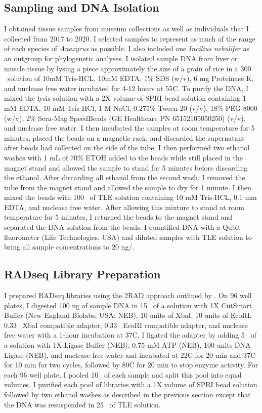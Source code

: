 \subsection{Sampling and DNA Isolation}
I obtained tissue samples from museum collections as well as individuals   
that I collected from 2017 to 2020. I selected samples to represent as much
of the range of each species of \textit{Anaxyrus} as possible.
I also included one \textit{Incilius nebulifer} as an outgroup for phylogenetic analyses.
I isolated sample DNA from liver or muscle tissue by lysing a piece approximately 
the size of a grain of rice in a 300 \uL\ solution of 10mM Tris-HCL, 10mM EDTA, 
1\% SDS (w/v), 6 mg Proteinase K, and nuclease free water incubated for 4-12 
hours at 55\degree C.  
To purify the DNA, I mixed the lysis solution with a 2X volume of SPRI bead 
solution containing 1 mM EDTA, 10 mM Tris-HCl, 1 M NaCl, 0.275\% Tween-20 (v/v), 18\% PEG 8000 (w/v), 
2\% Sera-Mag SpeedBeads (GE Healthcare PN 65152105050250) (v/v), and nuclease free water.
I then incubated the samples at room temperature for 5 minutes, placed the 
beads on a magnetic rack, and discarded the supernatant after beads had collected
on the side of the tube.  
I then performed two ethanol washes with 1 mL of 70\% ETOH added to the beads
while still placed in the magnet stand and allowed the sample to stand for 5 minutes
before discarding the ethanol. 
After discarding all ethanol from the second wash, I removed the tube from the magnet 
stand and allowed the sample to dry for 1 minute.
I then mixed the beads with 100 \uL\ of TLE solution containing 10 mM Tris-HCL, 
0.1 mm EDTA, and nuclease free water.
After allowing this mixture to stand at room temperature for 5 minutes, I returned
the beads to the magnet stand and separated the DNA solution from the beads.
I quantified DNA with a Qubit fluorometer (Life Technologies, USA) and diluted 
samples with TLE solution to bring all sample concentrations to 20 ng/\uL.

\subsection{RADseq Library Preparation}
I prepared RADseq libraries using the 2RAD approach outlined by \textcite{bayona-vasquez2019}. 
On 96 well plates, I digested 100 ng of sample DNA in 15 \uL\ of a solution with 
1X CutSmart Buffer (New England Biolabs, USA; NEB), 10 units of XbaI,
10 units of EcoRI, 0.33 \uM\ XbaI compatible adapter, 0.33 \uM\ EcoRI compatible adapter,
and nuclease free water with a 1-hour incubation at 37\degree C. 
I ligated the adapter by adding 5 \uL\ of a solution with 1X Ligase Buffer (NEB),
0.75 mM ATP (NEB), 100 units DNA Ligase (NEB), and nuclease free water 
and incubated at 22\degree C for 20 min and 37\degree C for 10 min for two cycles, 
followed by 80\degree C for 20 min to stop enzyme activity.
For each 96 well plate, I pooled 10 \uL\ of each sample and split this pool 
into equal volumes.
I purified each pool of libraries with a 1X volume of SPRI bead solution followed 
by two ethanol washes as described in the previous section except that the DNA 
was resuspended in 25 \uL\ of TLE solution. 

